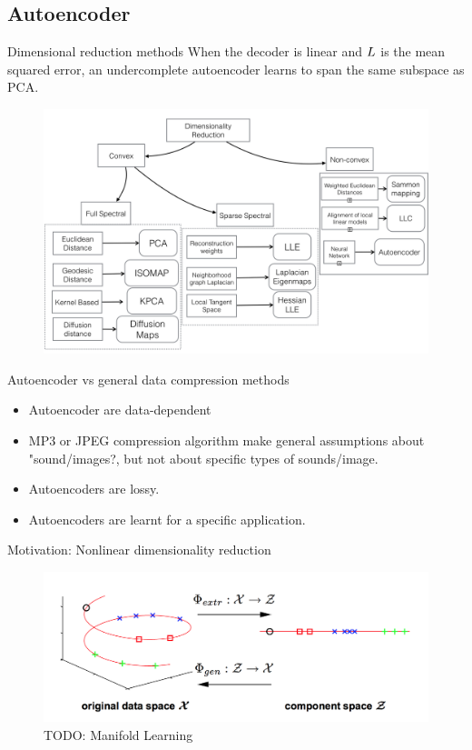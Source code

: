 \documentclass[xcolor=pdftex,dvipsnames,table,mathserif]{beamer}
\begin{document}
\subsection{Autoencoder}
\begin{frame}{Dimensional reduction methods}
When the decoder is linear and $L$ is the mean squared error, an undercomplete autoencoder learns to span the same subspace as PCA.
\begin{figure}
\includegraphics[width=.9\columnwidth]{../graphics/DimensionalityReduction}
\end{figure}
\end{frame}

\begin{frame}{Autoencoder vs general data compression methods}
\begin{itemize}
\item Autoencoder are data-dependent
\item MP3 or JPEG compression algorithm make general assumptions about "sound/images?, but not about
specific types of sounds/image.
\item Autoencoders are lossy.
\item Autoencoders are learnt for a specific application.
\end{itemize}
\end{frame}



\begin{frame}{Motivation: Nonlinear dimensionality reduction}
\begin{figure}
\includegraphics[width=.8\columnwidth]{../graphics/ManifoldLearning}
\caption{TODO: Manifold Learning}
\end{figure}
\end{frame}
\end{document}
